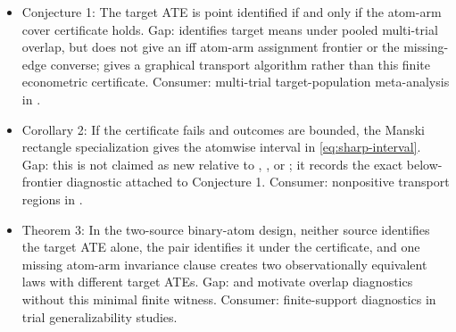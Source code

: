 \documentclass[11pt]{article}
\theoremstyle{definition}
\theoremstyle{plain}
\theoremstyle{remark}
\begin{document}
\begin{itemize}[leftmargin=*]
\item Conjecture 1: The target ATE is point identified if and only if the atom-arm cover certificate holds. Gap: \citet[Sec. 3.4, Theorem 3]{DahabrehRobertsonPetitoHernanSteingrimsson2023} identifies target means under pooled multi-trial overlap, but does not give an iff atom-arm assignment frontier or the missing-edge converse; \citet[Sec. 3]{BareinboimLeeHonavarPearl2013} gives a graphical transport algorithm rather than this finite econometric certificate. Consumer: multi-trial target-population meta-analysis in \citet{DahabrehRobertsonPetitoHernanSteingrimsson2023}.
\item Corollary 2: If the certificate fails and outcomes are bounded, the Manski rectangle specialization gives the atomwise interval in \eqref{eq:sharp-interval}. Gap: this is not claimed as new relative to \citet{Manski1990}, \citet{Robins1989}, or \citet{KlineTamer2018}; it records the exact below-frontier diagnostic attached to Conjecture 1. Consumer: nonpositive transport regions in \citet{ZivichEdwardsShookSaLofgrenLesslerCole2025}.
\item Theorem 3: In the two-source binary-atom design, neither source identifies the target ATE alone, the pair identifies it under the certificate, and one missing atom-arm invariance clause creates two observationally equivalent laws with different target ATEs. Gap: \citet{HotzImbensMortimer2005} and \citet{ColeStuart2010} motivate overlap diagnostics without this minimal finite witness. Consumer: finite-support diagnostics in trial generalizability studies.
\end{itemize}
\end{document}
